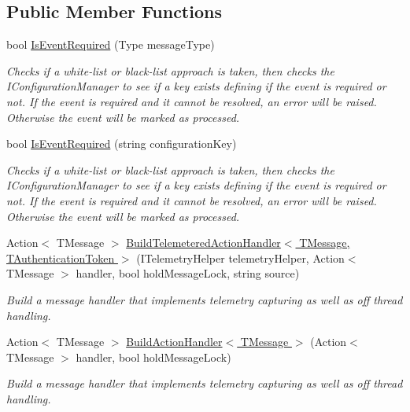 \subsection*{Public Member Functions}
\begin{DoxyCompactItemize}
\item 
bool \hyperlink{interfaceCqrs_1_1Bus_1_1IBusHelper_acddf7635d6de08e3b09d552361fe4fda}{Is\+Event\+Required} (Type message\+Type)
\begin{DoxyCompactList}\small\item\em Checks if a white-\/list or black-\/list approach is taken, then checks the I\+Configuration\+Manager to see if a key exists defining if the event is required or not. If the event is required and it cannot be resolved, an error will be raised. Otherwise the event will be marked as processed. \end{DoxyCompactList}\item 
bool \hyperlink{interfaceCqrs_1_1Bus_1_1IBusHelper_af73d0d2aa8e98566acb4b2fb13a3e986}{Is\+Event\+Required} (string configuration\+Key)
\begin{DoxyCompactList}\small\item\em Checks if a white-\/list or black-\/list approach is taken, then checks the I\+Configuration\+Manager to see if a key exists defining if the event is required or not. If the event is required and it cannot be resolved, an error will be raised. Otherwise the event will be marked as processed. \end{DoxyCompactList}\item 
Action$<$ T\+Message $>$ \hyperlink{interfaceCqrs_1_1Bus_1_1IBusHelper_a29751c186da5e2b042067af6a1be6d5d}{Build\+Telemetered\+Action\+Handler$<$ T\+Message, T\+Authentication\+Token $>$} (I\+Telemetry\+Helper telemetry\+Helper, Action$<$ T\+Message $>$ handler, bool hold\+Message\+Lock, string source)
\begin{DoxyCompactList}\small\item\em Build a message handler that implements telemetry capturing as well as off thread handling. \end{DoxyCompactList}\item 
Action$<$ T\+Message $>$ \hyperlink{interfaceCqrs_1_1Bus_1_1IBusHelper_ac69a1e4722e2839c2c180b9a06a8646c}{Build\+Action\+Handler$<$ T\+Message $>$} (Action$<$ T\+Message $>$ handler, bool hold\+Message\+Lock)
\begin{DoxyCompactList}\small\item\em Build a message handler that implements telemetry capturing as well as off thread handling. \end{DoxyCompactList}\end{DoxyCompactItemize}


